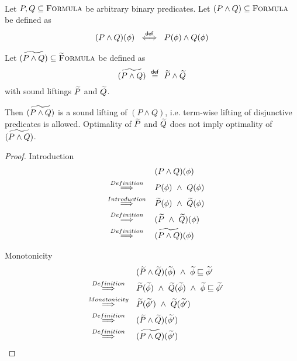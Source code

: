 \begin{lemma}~\\
    Let $P, Q \subseteq \textup{\textsc{Formula}}$ be arbitrary binary predicates.
    Let $(P \wedge Q) \subseteq \textup{\textsc{Formula}}$ be defined as
    \begin{displaymath}
    (P \wedge Q)(\phi) ~\overset{\textup{\textmd{\textsf{def}}}}{\iff}~ P(\phi) \wedge Q(\phi)
    \end{displaymath}
    
    Let $\widetilde{(P \wedge Q)} \subseteq \textup{\textsc{\ensuremath{\widetilde{\text{F}}}ormula}}$ be defined as
    \begin{displaymath}
    \widetilde{(P \wedge Q)} ~\overset{\textup{\textmd{\textsf{def}}}}{=}~ \widetilde{P} \wedge \widetilde{Q}
    \end{displaymath}
    with sound liftings $\widetilde{P}$ and $\widetilde{Q}$.
    
    Then $\widetilde{(P \wedge Q)}$ is a sound lifting of $(P \wedge Q)$, i.e. term-wise lifting of disjunctive predicates is allowed.
    Optimality of $\widetilde{P}$ and $\widetilde{Q}$ does not imply optimality of $\widetilde{(P \wedge Q)}$.
\end{lemma}
\begin{proof}
    Introduction
        \begin{align*}
        &(P \wedge Q)(\phi)\\
        \overset{Definition}{~\quad\quad\implies\quad\quad~}
        &P(\phi) ~\wedge~ Q(\phi)\\
        \overset{Introduction}{~\quad\quad\implies\quad\quad~}
        &\widetilde{P}(\phi) ~\wedge~ \widetilde{Q}(\phi)\\
        \overset{Definition}{~\quad\quad\implies\quad\quad~}
        &(\widetilde{P} ~\wedge~ \widetilde{Q})(\phi)\\
        \overset{Definition}{~\quad\quad\implies\quad\quad~}
        &\widetilde{(P \wedge Q)}(\phi)\\
        \end{align*}
    
    Monotonicity
        \begin{align*}
        &(\widetilde{P} \wedge \widetilde{Q})(\widetilde{\phi}) ~\wedge~ \widetilde{\phi} \sqsubseteq \widetilde{\phi'}\\
        \overset{Definition}{~\quad\quad\implies\quad\quad~}
        &\widetilde{P}(\widetilde{\phi}) ~\wedge~ \widetilde{Q}(\widetilde{\phi}) ~\wedge~ \widetilde{\phi} \sqsubseteq \widetilde{\phi'}\\
        \overset{Monotonicity}{~\quad\quad\implies\quad\quad~}
        &\widetilde{P}(\widetilde{\phi'}) ~\wedge~ \widetilde{Q}(\widetilde{\phi'})\\
        \overset{Definition}{~\quad\quad\implies\quad\quad~}
        &(\widetilde{P} \wedge \widetilde{Q})(\widetilde{\phi'})\\
        \overset{Definition}{~\quad\quad\implies\quad\quad~}
        &\widetilde{(P \wedge Q)}(\widetilde{\phi'})\\
        \end{align*}
\end{proof}

